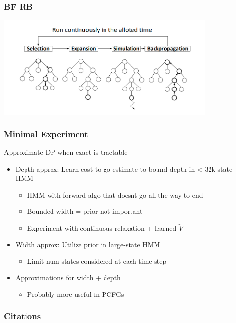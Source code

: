 \documentclass{beamer}
\begin{document}
\begin{frame}
\frametitle{BF RB}
\includegraphics[height=2in]{img/mcts.png}
\end{frame}

\begin{frame}
\frametitle{Minimal Experiment}
Approximate DP when exact is tractable
\begin{itemize}
\item Depth approx: Learn cost-to-go estimate to bound depth in < 32k state HMM
    \begin{itemize}
    \item HMM with forward algo that doesnt go all the way to end
    \item Bounded width = prior not important
    \item Experiment with continuous relaxation + learned $\tilde{V}$
    \end{itemize}
\item Width approx: Utilize prior in large-state HMM
    \begin{itemize}
    \item Limit num states considered at each time step
    \end{itemize}
\item Approximations for width + depth
    \begin{itemize}
    \item Probably more useful in PCFGs
    \end{itemize}
\end{itemize}
\end{frame}

\begin{frame}[allowframebreaks]
\frametitle{Citations}

\end{frame}
\end{document}
